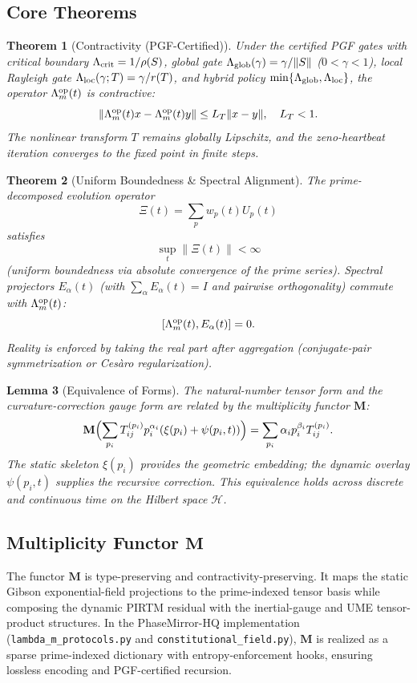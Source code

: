 \documentclass[11pt, a4paper]{article}
\newtheorem{theorem}{Theorem}
\newtheorem{lemma}[theorem]{Lemma}
\begin{document}
\subsection{Core Theorems}

\begin{theorem}[Contractivity (PGF-Certified)]
Under the certified PGF gates with critical boundary \(\Lambda_{\rm crit} = 1/\rho(S)\), global gate \(\Lambda_{\rm glob}(\gamma) = \gamma / \|S\|\) (\(0 < \gamma < 1\)), local Rayleigh gate \(\Lambda_{\rm loc}(\gamma; T) = \gamma / r(T)\), and hybrid policy \(\min\{\Lambda_{\rm glob}, \Lambda_{\rm loc}\}\), the operator \(\Lambda_m^{\rm op}(t)\) is contractive:
\[
\| \Lambda_m^{\rm op}(t) x - \Lambda_m^{\rm op}(t) y \| \leq L_T \| x - y \|, \quad L_T < 1.
\]
The nonlinear transform \(T\) remains globally Lipschitz, and the zeno-heartbeat iteration converges to the fixed point in finite steps.
\end{theorem}

\begin{theorem}[Uniform Boundedness \& Spectral Alignment]
The prime-decomposed evolution operator
\[
\Xi(t) = \sum_p w_p(t) U_p(t)
\]
satisfies
\[
\sup_t \|\Xi(t)\| < \infty
\]
(uniform boundedness via absolute convergence of the prime series). Spectral projectors \(E_\alpha(t)\) (with \(\sum_\alpha E_\alpha(t) = I\) and pairwise orthogonality) commute with \(\Lambda_m^{\rm op}(t)\):
\[
[\Lambda_m^{\rm op}(t), E_\alpha(t)] = 0.
\]
Reality is enforced by taking the real part after aggregation (conjugate-pair symmetrization or Cesàro regularization).
\end{theorem}

\begin{lemma}[Equivalence of Forms]
The natural-number tensor form and the curvature-correction gauge form are related by the multiplicity functor \(\mathbf{M}\):
\[
\mathbf{M}\Bigl( \sum_{p_i} T_{ij}^{(p_i)} p_i^{\alpha_i} (\xi(p_i) + \psi(p_i,t)) \Bigr) = \sum_{p_i} \alpha_i p_i^{\beta_i} T_{ij}^{(p_i)}.
\]
The static skeleton \(\xi(p_i)\) provides the geometric embedding; the dynamic overlay \(\psi(p_i,t)\) supplies the recursive correction. This equivalence holds across discrete and continuous time on the Hilbert space \(\mathcal{H}\).
\end{lemma}

\subsection{Multiplicity Functor \(\mathbf{M}\)}
The functor \(\mathbf{M}\) is type-preserving and contractivity-preserving. It maps the static Gibson exponential-field projections to the prime-indexed tensor basis while composing the dynamic PIRTM residual with the inertial-gauge and UME tensor-product structures. In the PhaseMirror-HQ implementation (\texttt{lambda\_m\_protocols.py} and \texttt{constitutional\_field.py}), \(\mathbf{M}\) is realized as a sparse prime-indexed dictionary with entropy-enforcement hooks, ensuring lossless encoding and PGF-certified recursion.
\end{document}
